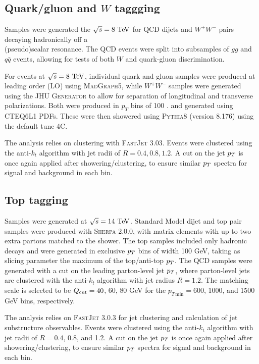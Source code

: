 \subsection{Quark/gluon and $W$ taggging}

Samples were generated the $\sqrt{s} = 8\TeV$ for QCD dijets and $W^+W^-$
pairs decaying hadronically off a \\
(pseudo)scalar resonance. The QCD events
were split into subsamples of $gg$ and $q\bar{q}$ events, allowing for tests
of both $W$ and quark-gluon discrimination. 

For events at $\sqrt{s} = 8\TeV$, individual quark and gluon samples were
produced at leading order (LO) using \textsc{MadGraph5}, while $W^+W^-$ samples
were generated using the \textsc{JHU Generator} to allow for separation
of longitudinal and transverse polarizations. Both were produced in $p_T$
bins of 100 \TeV. and generated using \textsc{CTEQ6L1} PDFs. These were
then showered using \textsc{Pythia8} (version 8.176) using the default tune 4C.

The analysis relies on clustering with \textsc{FastJet} 3.03. Events were
clustered using the anti-$k_t$ algorithm with jet radii of $R = 0.4, 0.8, 1.2$.
A cut on the jet $p_T$ is once again applied after showering/clustering, to ensure
similar $p_T$ spectra for signal and background in each bin.

\subsection{Top tagging}
Samples were generated at $\sqrt{s}=14\TeV$. Standard Model dijet and top pair samples were produced
with \textsc{Sherpa} 2.0.0, with matrix elements with up to two extra partons matched
to the shower. The top samples included only hadronic decays and
 were generated in exclusive $p_T$ bins of width 100 GeV, taking as slicing parameter the
 maximum of the top/anti-top $p_T$. The QCD samples were generated with a cut on the leading
 parton-level jet $p_T$, where parton-level jets are clustered with the anti-$k_t$ algorithm with jet radius
 $R=1.2$. The matching scale is selected to be $Q_{\rm cut}=40$, 60, 80 GeV for the $p_{T\,\mathrm{min}}=600$, 1000, and 1500 GeV bins, respectively.
 
 The analysis relies on  \textsc{FastJet} 3.0.3 for jet clustering and calculation of jet substructure observables. Events were clustered using the anti-$k_t$ algorithm with jet radii of $R=0.4$, 0.8, and 1.2. A cut on the jet $p_T$ is once again applied after showering/clustering, to ensure
similar $p_T$ spectra for signal and background in each bin.
